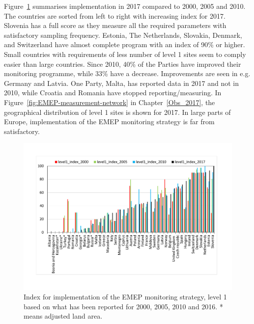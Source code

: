 Figure~\ref{fig:Index-for-implementation} summarises implementation in 2017 compared to 2000, 2005 and 
2010. The countries are sorted from left to right with increasing index for 2017. Slovenia has a full 
score as they measure all the required parameters with satisfactory sampling frequency. Estonia, 
The Netherlands, Slovakia, Denmark, and Switzerland have almost complete program with an index 
of 90\% or higher. Small countries with requirements of less number of level 1 sites seem to comply 
easier than large countries. Since 2010, 40\% of the Parties have improved their monitoring programme,
 while 33\% have a decrease. Improvements are seen in e.g. Germany and Latvia.  
 One Party, Malta, has reported data in 2017 and not in 2010, while Croatia and Romania have stopped 
reporting/measuring. In Figure~\ref{fig:EMEP-measurement-network} in 
Chapter~\ref{Obs_2017}, the geographical distribution of level 1 sites is shown for 2017.  
In large parts of Europe, implementation of the EMEP monitoring strategy is far from satisfactory. 


\begin{figure}
	\centering
	\includegraphics[width=0.74\paperwidth]{FIGS_Obs/index2017.pdf}
	\caption{\label{fig:Index-for-implementation}Index for implementation of the EMEP monitoring strategy, level 1 based on what has been reported for 2000, 2005, 2010 and 2016. {*} means adjusted land area.}
\end{figure}

